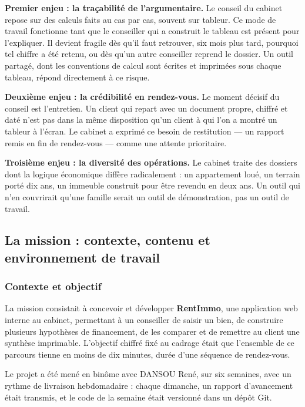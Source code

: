 \documentclass[12pt,a4paper]{article}
\newcommand{\binome}{DANSOU René}
\begin{document}
\textbf{Premier enjeu : la traçabilité de l'argumentaire.} Le conseil du cabinet
repose sur des calculs faits au cas par cas, souvent sur tableur. Ce mode de
travail fonctionne tant que le conseiller qui a construit le tableau est présent
pour l'expliquer. Il devient fragile dès qu'il faut retrouver, six mois plus
tard, pourquoi tel chiffre a été retenu, ou dès qu'un autre conseiller reprend le
dossier. Un outil partagé, dont les conventions de calcul sont écrites et
imprimées sous chaque tableau, répond directement à ce risque.

\textbf{Deuxième enjeu : la crédibilité en rendez-vous.} Le moment décisif du
conseil est l'entretien. Un client qui repart avec un document propre, chiffré et
daté n'est pas dans la même disposition qu'un client à qui l'on a montré un
tableur à l'écran. Le cabinet a exprimé ce besoin de restitution --- un rapport
remis en fin de rendez-vous --- comme une attente prioritaire.

\textbf{Troisième enjeu : la diversité des opérations.} Le cabinet traite des
dossiers dont la logique économique diffère radicalement : un appartement loué,
un terrain porté dix ans, un immeuble construit pour être revendu en deux ans.
Un outil qui n'en couvrirait qu'une famille serait un outil de démonstration,
pas un outil de travail.

\subsection{La mission : contexte, contenu et environnement de travail}

\subsubsection{Contexte et objectif}

La mission consistait à concevoir et développer \textbf{RentImmo}, une
application web interne au cabinet, permettant à un conseiller de saisir un
bien, de construire plusieurs hypothèses de financement, de les comparer et de
remettre au client une synthèse imprimable. L'objectif chiffré fixé au cadrage
était que l'ensemble de ce parcours tienne en moins de dix minutes, durée d'une
séquence de rendez-vous.

Le projet a été mené en binôme avec \binome, sur six semaines, avec un rythme de
livraison hebdomadaire : chaque dimanche, un rapport d'avancement était transmis,
et le code de la semaine était versionné dans un dépôt Git.
\end{document}
